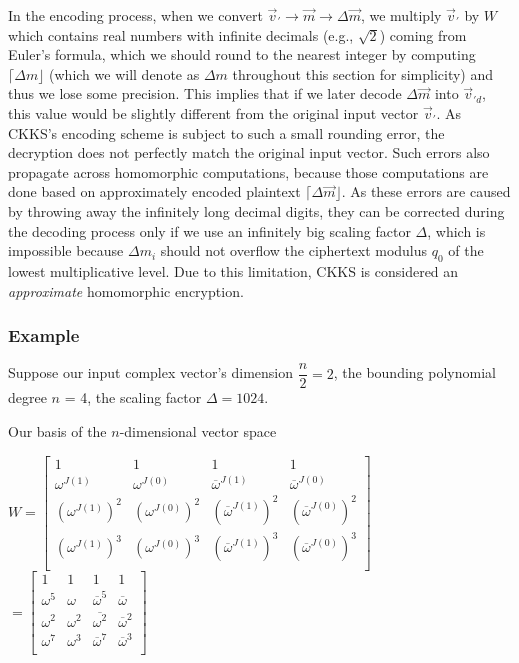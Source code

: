  In the encoding process, when we convert $\vec{v}_{'} \rightarrow \vec{m} \rightarrow \Delta\vec{m}$, we multiply $\vec{v}_{'}$ by $W$ which contains real numbers with infinite decimals (e.g., $\sqrt{2}$) coming from Euler's formula, which we should round to the nearest integer by computing $\lceil \Delta m \rfloor$ (which we will denote as $\Delta m$ throughout this section for simplicity) and thus we lose some precision. This implies that if we later decode $\Delta\vec{m}$ into $\vec{v}_{'d}$, this value would be slightly different from the original input vector $\vec{v}_{'}$. As CKKS's encoding scheme is subject to such a small rounding error, the decryption does not perfectly match the original input vector. Such errors also propagate across homomorphic computations, because those computations are done based on approximately encoded plaintext $\lceil \Delta \vec{m} \rfloor$. As these errors are caused by throwing away the infinitely long decimal digits, they can be corrected during the decoding process only if we use an infinitely big scaling factor $\Delta$, which is impossible because $\Delta m_i$ should not overflow the ciphertext modulus $q_0$ of the lowest multiplicative level. Due to this limitation, CKKS is considered an \textit{approximate} homomorphic encryption. 


\subsubsection{Example}
\label{subsubsec:ckks-encoding-ex}


Suppose our input complex vector's dimension $\dfrac{n}{2} = 2$, the bounding polynomial degree $n$ = 4, the scaling factor $\Delta = 1024$. 

Our basis of the $n$-dimensional vector space 

$W= \begin{bmatrix}
1 & 1 & 1 & 1\\
\omega^{J(1)} & \omega^{J(0)} & \overline{\omega}^{J(1)} & \overline{\omega}^{J(0)}\\
(\omega^{J(1)})^2 & ({\omega^{J(0)}})^2 & (\overline{\omega}^{J(1)})^2 & (\overline{\omega}^{J(0)})^2\\
(\omega^{J(1)})^3 & (\omega^{J(0)})^3 & (\overline{\omega}^{J(1)})^3 & (\overline{\omega}^{J(0)})^3\\
\end{bmatrix}$
$= \begin{bmatrix}
1 & 1 & 1 & 1\\
\omega^5 & \omega & \overline{\omega}^5 & \overline{\omega}\\
\omega^2 & \omega^2 & \overline{\omega^2} & \overline{\omega}^2\\
\omega^7 & \omega^3 & \overline{\omega}^7 & \overline{\omega}^3\\
\end{bmatrix}$

